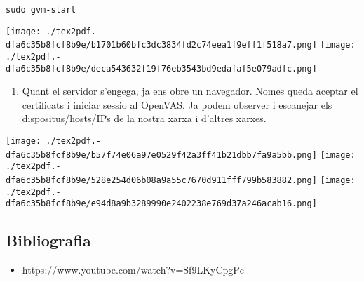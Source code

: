 \documentclass[]{article}
\providecommand{\tightlist}{%
  \setlength{\itemsep}{0pt}\setlength{\parskip}{0pt}}
\begin{document}
\texttt{sudo\ gvm-start}

\texttt{[image: ./tex2pdf.-dfa6c35b8fcf8b9e/b1701b60bfc3dc3834fd2c74eea1f9eff1f518a7.png]}
\texttt{[image: ./tex2pdf.-dfa6c35b8fcf8b9e/deca543632f19f76eb3543bd9edafaf5e079adfc.png]}

\begin{enumerate}
\def\labelenumi{\arabic{enumi}.}
\setcounter{enumi}{5}
\tightlist
\item
  Quant el servidor s'engega, ja ens obre un navegador. Nomes queda
  aceptar el certificats i iniciar sessio al OpenVAS. Ja podem observer
  i escanejar els dispositus/hosts/IPs de la nostra xarxa i d'altres
  xarxes.
\end{enumerate}

\texttt{[image: ./tex2pdf.-dfa6c35b8fcf8b9e/b57f74e06a97e0529f42a3ff41b21dbb7fa9a5bb.png]}
\texttt{[image: ./tex2pdf.-dfa6c35b8fcf8b9e/528e254d06b08a9a55c7670d911fff799b583882.png]}
\texttt{[image: ./tex2pdf.-dfa6c35b8fcf8b9e/e94d8a9b3289990e2402238e769d37a246acab16.png]}

\hypertarget{bibliografia}{%
\subsection{\texorpdfstring{\textbf{Bibliografia}}{Bibliografia}}\label{bibliografia}}

\begin{itemize}
\tightlist
\item
  https://www.youtube.com/watch?v=Sf9LKyCpgPc
\end{itemize}
\end{document}
